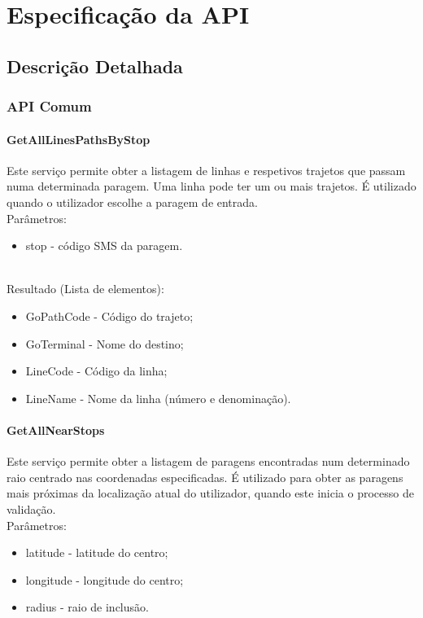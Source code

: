 \chapter{Especificação da API} \label{api}

\section{Descrição Detalhada}

\subsection{API Comum}

\subsubsection{GetAllLinesPathsByStop}

Este serviço permite obter a listagem de linhas e respetivos trajetos que passam numa determinada paragem. Uma linha pode ter um ou mais trajetos. É utilizado quando o utilizador escolhe a paragem de entrada.
\newline
~\\Parâmetros:
\begin{itemize}
\item stop - código SMS da paragem.
\end{itemize}

~\\Resultado (Lista de elementos):
\begin{itemize}
\item GoPathCode - Código do trajeto;
\item GoTerminal - Nome do destino;
\item LineCode - Código da linha;
\item LineName - Nome da linha (número e denominação).
\end{itemize}

\subsubsection{GetAllNearStops}

Este serviço permite obter a listagem de paragens encontradas num determinado raio centrado nas coordenadas especificadas. É utilizado para obter as paragens mais próximas da localização atual do utilizador, quando este inicia o processo de validação.
\newline
~\\Parâmetros:
\begin{itemize}
\item latitude - latitude do centro;
\item longitude - longitude do centro;
\item radius - raio de inclusão.
\end{itemize}

